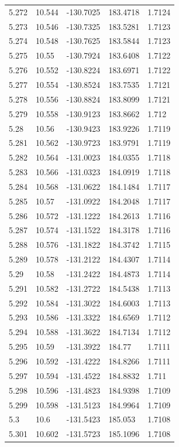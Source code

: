 \begin{tabular}{lllll}
5.272 & 10.544 & -130.7025 & 183.4718 & 1.7124 \\
5.273 & 10.546 & -130.7325 & 183.5281 & 1.7123 \\
5.274 & 10.548 & -130.7625 & 183.5844 & 1.7123 \\
5.275 & 10.55 & -130.7924 & 183.6408 & 1.7122 \\
5.276 & 10.552 & -130.8224 & 183.6971 & 1.7122 \\
5.277 & 10.554 & -130.8524 & 183.7535 & 1.7121 \\
5.278 & 10.556 & -130.8824 & 183.8099 & 1.7121 \\
5.279 & 10.558 & -130.9123 & 183.8662 & 1.712 \\
5.28 & 10.56 & -130.9423 & 183.9226 & 1.7119 \\
5.281 & 10.562 & -130.9723 & 183.9791 & 1.7119 \\
5.282 & 10.564 & -131.0023 & 184.0355 & 1.7118 \\
5.283 & 10.566 & -131.0323 & 184.0919 & 1.7118 \\
5.284 & 10.568 & -131.0622 & 184.1484 & 1.7117 \\
5.285 & 10.57 & -131.0922 & 184.2048 & 1.7117 \\
5.286 & 10.572 & -131.1222 & 184.2613 & 1.7116 \\
5.287 & 10.574 & -131.1522 & 184.3178 & 1.7116 \\
5.288 & 10.576 & -131.1822 & 184.3742 & 1.7115 \\
5.289 & 10.578 & -131.2122 & 184.4307 & 1.7114 \\
5.29 & 10.58 & -131.2422 & 184.4873 & 1.7114 \\
5.291 & 10.582 & -131.2722 & 184.5438 & 1.7113 \\
5.292 & 10.584 & -131.3022 & 184.6003 & 1.7113 \\
5.293 & 10.586 & -131.3322 & 184.6569 & 1.7112 \\
5.294 & 10.588 & -131.3622 & 184.7134 & 1.7112 \\
5.295 & 10.59 & -131.3922 & 184.77 & 1.7111 \\
5.296 & 10.592 & -131.4222 & 184.8266 & 1.7111 \\
5.297 & 10.594 & -131.4522 & 184.8832 & 1.711 \\
5.298 & 10.596 & -131.4823 & 184.9398 & 1.7109 \\
5.299 & 10.598 & -131.5123 & 184.9964 & 1.7109 \\
5.3 & 10.6 & -131.5423 & 185.053 & 1.7108 \\
5.301 & 10.602 & -131.5723 & 185.1096 & 1.7108 \\

\end{tabular}

